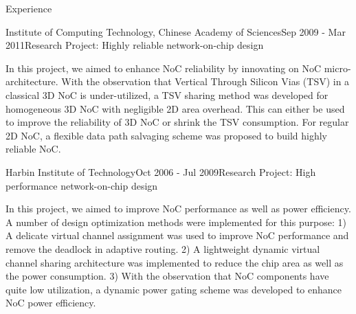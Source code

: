 \documentclass{resume} %
\begin{document}
\begin{rSection}{Experience}

\begin{rSubsection}{Institute of Computing Technology, Chinese Academy of Sciences}{Sep 2009 - Mar 2011}{Research Project: Highly reliable network-on-chip design}{}
\item In this project, we aimed to enhance NoC reliability by innovating on NoC micro-architecture. With
    the observation that Vertical Through Silicon Vias (TSV) in a classical 3D NoC is
    under-utilized, a TSV sharing method was developed for homogeneous 3D NoC with negligible 2D area
    overhead. This can either be used to improve the reliability of 3D NoC or shrink the TSV consumption.
    For regular 2D NoC, a flexible data path salvaging scheme was proposed to build highly reliable NoC.
\end{rSubsection}


\begin{rSubsection}{Harbin Institute of Technology}{Oct 2006 - Jul 2009}{Research Project: High performance network-on-chip design}{}
\item In this project, we aimed to improve NoC performance as well as power efficiency. A number of design
optimization methods were implemented for this purpose: 1) A delicate virtual channel assignment was
used to improve NoC performance and remove the deadlock in adaptive routing. 2) A lightweight
dynamic virtual channel sharing architecture was implemented to reduce the chip area as well as the
power consumption. 3) With the observation that NoC components have quite low utilization, a dynamic
power gating scheme was developed to enhance NoC power efficiency.
\end{rSubsection}

\end{rSection}
\end{document}
